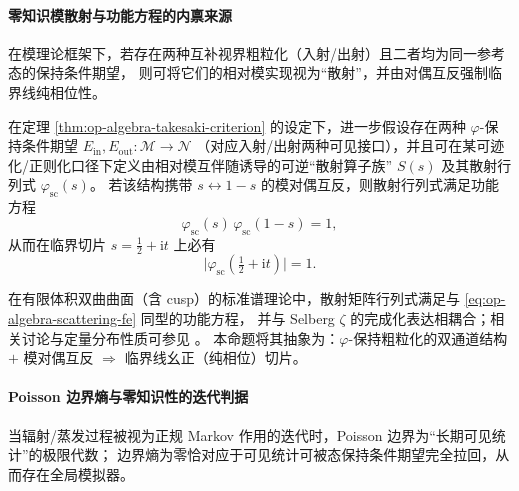 \paragraph{零知识模散射与功能方程的内禀来源}
在模理论框架下，若存在两种互补视界粗粒化（入射/出射）且二者均为同一参考态的保持条件期望，
则可将它们的相对模实现视为“散射”，并由对偶互反强制临界线纯相位性。

\begin{proposition}[模散射行列式的反射对偶与临界线纯相位性]\label{prop:op-algebra-modular-scattering-phase}
在定理 \ref{thm:op-algebra-takesaki-criterion} 的设定下，进一步假设存在两种 \(\varphi\)-保持条件期望
\(
E_{\mathrm{in}},E_{\mathrm{out}}:\mathcal{M}\to\mathcal{N}
\)
（对应入射/出射两种可见接口），并且可在某可迹化/正则化口径下定义由相对模互伴随诱导的可逆“散射算子族” \(S(s)\) 及其散射行列式 \(\varphi_{\mathrm{sc}}(s)\)。
若该结构携带 \(s\leftrightarrow 1-s\) 的模对偶互反，则散射行列式满足功能方程
\begin{equation}\label{eq:op-algebra-scattering-fe}
\boxed{\;\varphi_{\mathrm{sc}}(s)\,\varphi_{\mathrm{sc}}(1-s)=1,\;}
\end{equation}
从而在临界切片 \(s=\tfrac12+\mathrm{i}t\) 上必有
\begin{equation}\label{eq:op-algebra-scattering-unit-modulus}
\boxed{\;\bigl|\varphi_{\mathrm{sc}}(\tfrac12+\mathrm{i}t)\bigr|=1.\;}
\end{equation}
\end{proposition}

\begin{remark}[与有限体积双曲曲面散射的同型性]\label{rem:op-algebra-scattering-selberg-analogy}
在有限体积双曲曲面（含 cusp）的标准谱理论中，散射矩阵行列式满足与 \eqref{eq:op-algebra-scattering-fe} 同型的功能方程，
并与 Selberg \(\zeta\) 的完成化表达相耦合；相关讨论与定量分布性质可参见 \cite{GarunkstisSimenas2017SelbergAValues}。
本命题将其抽象为：\(\varphi\)-保持粗粒化的双通道结构 \(+\) 模对偶互反 \(\Rightarrow\) 临界线幺正（纯相位）切片。
\end{remark}

\paragraph{Poisson 边界熵与零知识性的迭代判据}
当辐射/蒸发过程被视为正规 Markov 作用的迭代时，Poisson 边界为“长期可见统计”的极限代数；
边界熵为零恰对应于可见统计可被态保持条件期望完全拉回，从而存在全局模拟器。

